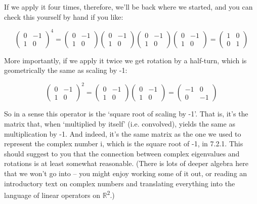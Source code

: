 \documentclass[oneside,english]{amsbook}
\numberwithin{section}{chapter}
\theoremstyle{plain}
\theoremstyle{definition}
\begin{document}
If we apply it four times, therefore, we'll be back where we started,
and you can check this yourself by hand if you like:

\[\begin{pmatrix}
	0 & - 1 \\
	1 & 0
\end{pmatrix}^{4} = \begin{pmatrix}
	0 & - 1 \\
	1 & 0
\end{pmatrix}\begin{pmatrix}
	0 & - 1 \\
	1 & 0
\end{pmatrix}\begin{pmatrix}
	0 & - 1 \\
	1 & 0
\end{pmatrix}\begin{pmatrix}
	0 & - 1 \\
	1 & 0
\end{pmatrix} = \begin{pmatrix}
	1 & 0 \\
	0 & 1
\end{pmatrix}\]

More importantly, if we apply it twice we get rotation by a half-turn,
which is geometrically the same as scaling by -1:

\[\begin{pmatrix}
	0 & - 1 \\
	1 & 0
\end{pmatrix}^{2} = \begin{pmatrix}
	0 & - 1 \\
	1 & 0
\end{pmatrix}\begin{pmatrix}
	0 & - 1 \\
	1 & 0
\end{pmatrix} = \begin{pmatrix}
	- 1 & 0 \\
	0 & - 1
\end{pmatrix}\]

So in a sense this operator is the `square root of scaling by -1'.
That is, it's the matrix that, when `multiplied by itself' (i.e.
convolved), yields the same as multiplication by -1. And indeed, it's
the same matrix as the one we used to represent the complex number i,
which is the square root of -1, in 7.2.1. This should suggest to you
that the connection between complex eigenvalues and rotations is at
least somewhat reasonable. (There is lots of deeper algebra here that we
won't go into -- you might enjoy working some of it out, or reading an
introductory text on complex numbers and translating everything into the
language of linear operators on $\mathbb{R}$\textsuperscript{2}.)
\end{document}
